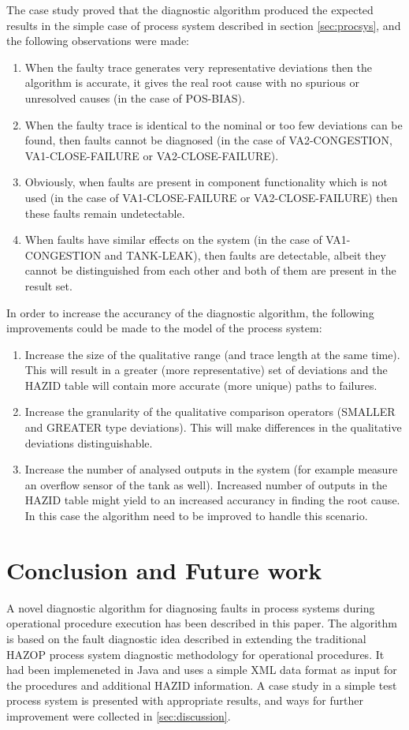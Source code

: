 \documentclass[conference]{IEEEtran}
\begin{document}
The case study proved that the diagnostic algorithm produced the expected results in the simple case of process system described in section \ref{sec:procsys}, and the following observations were made:

\begin{enumerate}
\item When the faulty trace generates very representative deviations then the algorithm is accurate, it gives the real root cause with no spurious or unresolved causes (in the case of POS-BIAS).
\item When the faulty trace is identical to the nominal or too few deviations can be found, then faults cannot be diagnosed (in the case of VA2-CONGESTION, VA1-CLOSE-FAILURE or VA2-CLOSE-FAILURE).
\item Obviously, when faults are present in component functionality which is not used (in the case of VA1-CLOSE-FAILURE or VA2-CLOSE-FAILURE) then these faults remain undetectable.
\item When faults have similar effects on the system (in the case of VA1-CONGESTION and TANK-LEAK), then faults are detectable, albeit they cannot be distinguished from each other and both of them are present in the result set.
\end{enumerate}

In order to increase the accurancy of the diagnostic algorithm, the following improvements could be made to the model of the process system:
\begin{enumerate}
\item Increase the size of the qualitative range (and trace length at the same time). This will result in a greater (more representative) set of deviations and the HAZID table will contain more accurate (more unique) paths to failures.
\item Increase the granularity of the qualitative comparison operators (SMALLER and GREATER type deviations). This will make differences in the qualitative deviations distinguishable.
\item Increase the number of analysed outputs in the system (for example measure an overflow sensor of the tank as well). Increased number of outputs in the HAZID table might yield to an increased accurancy in finding the root cause. In this case the algorithm need to be improved to handle this scenario.
\end{enumerate}

\section {Conclusion and Future work}
A novel diagnostic algorithm for diagnosing faults in process systems during operational procedure execution has been described in this paper. The algorithm is based on the fault diagnostic idea described in \cite{KES2011} extending the traditional HAZOP process system diagnostic methodology for operational procedures. It had been implemeneted in Java and uses a simple XML data format as input for the procedures and additional HAZID information. A case study in a simple test process system is presented with appropriate results, and ways for further improvement were collected in \ref{sec:discussion}.
\end{document}
